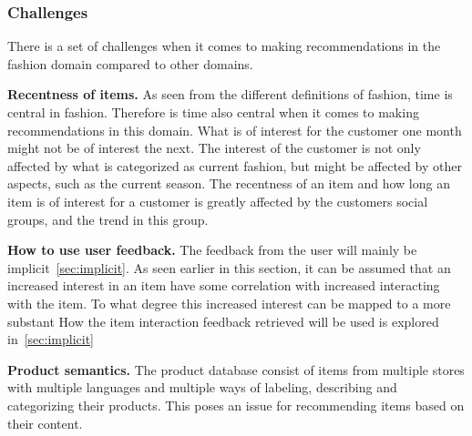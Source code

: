 \subsubsection{Challenges}
There is a set of challenges when it comes to making recommendations in the fashion domain compared to other domains.

\textbf{Recentness of items.}
As seen from the different definitions of fashion, time is central in fashion.
Therefore is time also central when it comes to making recommendations in this domain.
What is of interest for the customer one month might not be of interest the next.
The interest of the customer is not only affected by what is categorized as current fashion, but might be affected by other aspects, such as the current season.
The recentness of an item and how long an item is of interest for a customer is greatly affected by the customers social groups, and the trend in this group.

\textbf{How to use user feedback.}
The feedback from the user will mainly be implicit~\ref{sec:implicit}.
As seen earlier in this section, it can be assumed that an increased interest in an item have some correlation with increased interacting with the item.
To what degree this increased interest can be mapped to a more substant %
How the item interaction feedback retrieved will be used is explored in~\ref{sec:implicit}

\textbf{Product semantics.}
The product database consist of items from multiple stores with multiple languages and multiple ways of labeling, describing and categorizing their products.
This poses an issue for recommending items based on their content.



